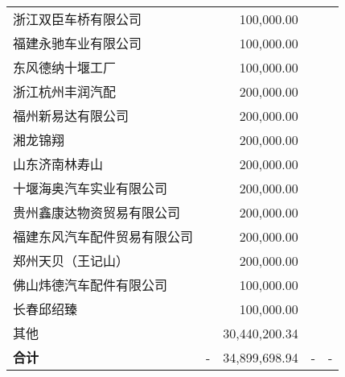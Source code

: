 \begin{longtable}{>{\scriptsize}l>{\scriptsize}r>{\scriptsize}r>{\scriptsize}r>{\scriptsize}r}
浙江双臣车桥有限公司 &  &
100,000.00  &  & \\
福建永驰车业有限公司 &  &
100,000.00  &  & \\
东风德纳十堰工厂 &  &
100,000.00  &  & \\
浙江杭州丰润汽配 &  &
200,000.00  &  & \\
福州新易达有限公司 &  &
200,000.00  &  & \\
湘龙锦翔 &  &
200,000.00  &  & \\
山东济南林寿山 &  &
200,000.00  &  & \\
十堰海奥汽车实业有限公司 &  &
200,000.00  &  & \\
贵州鑫康达物资贸易有限公司 &  &
200,000.00  &  & \\
福建东风汽车配件贸易有限公司 &  &
200,000.00  &  & \\
郑州天贝（王记山） &  &
200,000.00  &  & \\
佛山炜德汽车配件有限公司 &  &
100,000.00  &  & \\
长春邱绍臻 &  &
100,000.00  &  & \\
其他 &  &
30,440,200.34 &  & \\
\midrule
\bfseries 合计 & - & 34,899,698.94 & - & -\\
\bottomrule
\end{longtable}

